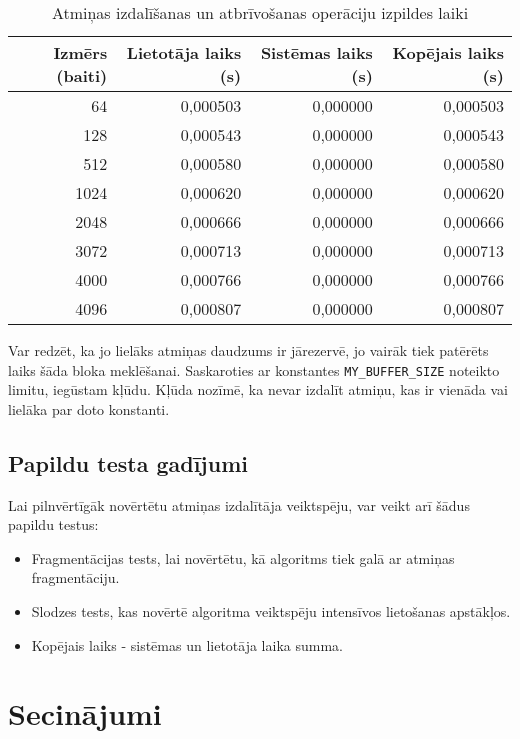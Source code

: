 \documentclass{article}
\begin{document}
	\begin{table}[H]
		\centering
		\begin{tabular}{@{}rrrr@{}}
			\toprule
			\textbf{Izmērs (baiti)} & \textbf{Lietotāja laiks (s)} & \textbf{Sistēmas laiks (s)} & \textbf{Kopējais laiks (s)} \\
			\midrule
			64 & 0,000503 & 0,000000 & 0,000503 \\
			128 & 0,000543 & 0,000000 & 0,000543 \\
			512 & 0,000580 & 0,000000 & 0,000580 \\
			1024 & 0,000620 & 0,000000 & 0,000620 \\
			2048 & 0,000666 & 0,000000 & 0,000666 \\
			3072 & 0,000713 & 0,000000 & 0,000713 \\
			4000 & 0,000766 & 0,000000 & 0,000766 \\
			4096 & 0,000807 & 0,000000 & 0,000807 \\
			\bottomrule
		\end{tabular}
		\caption{ Atmiņas izdalīšanas un atbrīvošanas operāciju izpildes laiki}
		\label{tab:performance}
	\end{table}
	
	Var redzēt, ka jo lielāks atmiņas daudzums ir jārezervē, jo vairāk tiek patērēts laiks šāda bloka meklēšanai. Saskaroties ar konstantes \texttt{MY\_BUFFER\_SIZE} noteikto limitu, iegūstam kļūdu. Kļūda nozīmē, ka nevar izdalīt atmiņu, kas ir vienāda vai lielāka par doto konstanti.
	
	\subsection{Papildu testa gadījumi}
	
	Lai pilnvērtīgāk novērtētu atmiņas izdalītāja veiktspēju, var veikt arī šādus papildu testus:

	\begin{itemize}
		\item Fragmentācijas tests, lai novērtētu, kā algoritms tiek galā ar atmiņas fragmentāciju.
		\item Slodzes tests, kas novērtē algoritma veiktspēju intensīvos lietošanas apstākļos.
		\item Kopējais laiks - sistēmas un lietotāja laika summa.
	\end{itemize}

	\section{Secinājumi}
	
\end{document}
